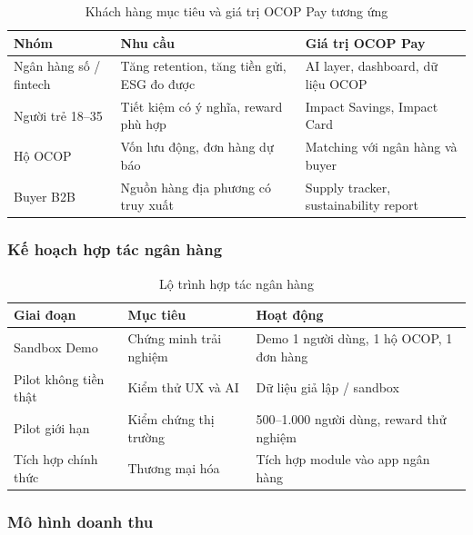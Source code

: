 \documentclass[13pt,a4paper]{extarticle}
\begin{document}
\begin{table}[H]
\centering
\caption{Khách hàng mục tiêu và giá trị OCOP Pay tương ứng}
\begin{tabular}{|p{3cm}|p{5cm}|p{5cm}|}
\hline
\textbf{Nhóm} & \textbf{Nhu cầu} & \textbf{Giá trị OCOP Pay} \\
\hline
Ngân hàng số / fintech & Tăng retention, tăng tiền gửi, ESG đo được & AI layer, dashboard, dữ liệu OCOP \\
\hline
Người trẻ 18--35 & Tiết kiệm có ý nghĩa, reward phù hợp & Impact Savings, Impact Card \\
\hline
Hộ OCOP & Vốn lưu động, đơn hàng dự báo & Matching với ngân hàng và buyer \\
\hline
Buyer B2B & Nguồn hàng địa phương có truy xuất & Supply tracker, sustainability report \\
\hline
\end{tabular}
\end{table}

\subsubsection{Kế hoạch hợp tác ngân hàng}

\begin{table}[H]
\centering
\caption{Lộ trình hợp tác ngân hàng}
\begin{tabular}{|p{3cm}|p{4cm}|p{6cm}|}
\hline
\textbf{Giai đoạn} & \textbf{Mục tiêu} & \textbf{Hoạt động} \\
\hline
Sandbox Demo & Chứng minh trải nghiệm & Demo 1 người dùng, 1 hộ OCOP, 1 đơn hàng \\
\hline
Pilot không tiền thật & Kiểm thử UX và AI & Dữ liệu giả lập / sandbox \\
\hline
Pilot giới hạn & Kiểm chứng thị trường & 500--1.000 người dùng, reward thử nghiệm \\
\hline
Tích hợp chính thức & Thương mại hóa & Tích hợp module vào app ngân hàng \\
\hline
\end{tabular}
\end{table}

\subsubsection{Mô hình doanh thu}
\end{document}
